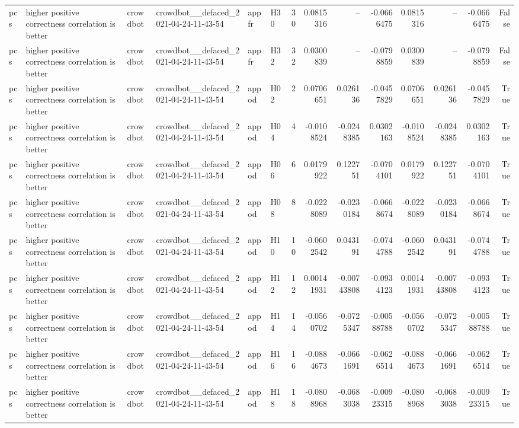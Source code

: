 \begin{longtable}{llllllrrrrrrrr}
pcs & higher positive correctness correlation is better & crowdbot & crowdbot\_\_defaced\_2021-04-24-11-43-54 & appfr & H30 & 30 & 0.0815316 & -- & -0.0666475 & 0.0815316 & -- & -0.0666475 & False \\
pcs & higher positive correctness correlation is better & crowdbot & crowdbot\_\_defaced\_2021-04-24-11-43-54 & appfr & H32 & 32 & 0.0300839 & -- & -0.0798859 & 0.0300839 & -- & -0.0798859 & False \\
pcs & higher positive correctness correlation is better & crowdbot & crowdbot\_\_defaced\_2021-04-24-11-43-54 & appod & H02 & 2 & 0.0706651 & 0.026136 & -0.0457829 & 0.0706651 & 0.026136 & -0.0457829 & True \\
pcs & higher positive correctness correlation is better & crowdbot & crowdbot\_\_defaced\_2021-04-24-11-43-54 & appod & H04 & 4 & -0.0108524 & -0.0248385 & 0.0302163 & -0.0108524 & -0.0248385 & 0.0302163 & True \\
pcs & higher positive correctness correlation is better & crowdbot & crowdbot\_\_defaced\_2021-04-24-11-43-54 & appod & H06 & 6 & 0.0179922 & 0.122751 & -0.0704101 & 0.0179922 & 0.122751 & -0.0704101 & True \\
pcs & higher positive correctness correlation is better & crowdbot & crowdbot\_\_defaced\_2021-04-24-11-43-54 & appod & H08 & 8 & -0.0228089 & -0.0230184 & -0.0668674 & -0.0228089 & -0.0230184 & -0.0668674 & True \\
pcs & higher positive correctness correlation is better & crowdbot & crowdbot\_\_defaced\_2021-04-24-11-43-54 & appod & H10 & 10 & -0.0602542 & 0.043191 & -0.0744788 & -0.0602542 & 0.043191 & -0.0744788 & True \\
pcs & higher positive correctness correlation is better & crowdbot & crowdbot\_\_defaced\_2021-04-24-11-43-54 & appod & H12 & 12 & 0.00141931 & -0.00743808 & -0.0934123 & 0.00141931 & -0.00743808 & -0.0934123 & True \\
pcs & higher positive correctness correlation is better & crowdbot & crowdbot\_\_defaced\_2021-04-24-11-43-54 & appod & H14 & 14 & -0.0560702 & -0.0725347 & -0.00588788 & -0.0560702 & -0.0725347 & -0.00588788 & True \\
pcs & higher positive correctness correlation is better & crowdbot & crowdbot\_\_defaced\_2021-04-24-11-43-54 & appod & H16 & 16 & -0.0884673 & -0.0661691 & -0.0626514 & -0.0884673 & -0.0661691 & -0.0626514 & True \\
pcs & higher positive correctness correlation is better & crowdbot & crowdbot\_\_defaced\_2021-04-24-11-43-54 & appod & H18 & 18 & -0.0808968 & -0.0683038 & -0.00923315 & -0.0808968 & -0.0683038 & -0.00923315 & True \\

\end{longtable}

